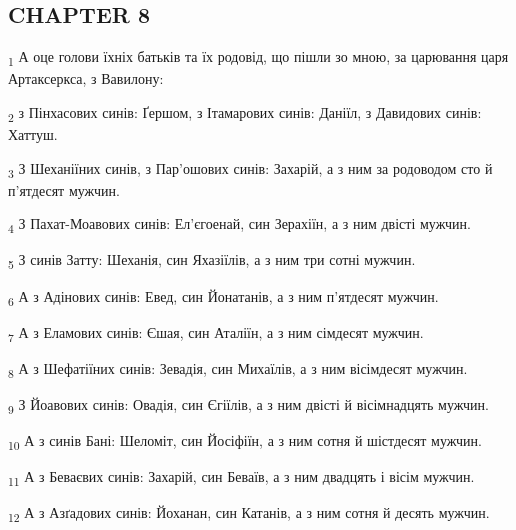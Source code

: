 \subsection{CHAPTER 8}
\begin{tcolorbox}
\textsubscript{1} А оце голови їхніх батьків та їх родовід, що пішли зо мною, за царювання царя Артаксеркса, з Вавилону:
\end{tcolorbox}
\begin{tcolorbox}
\textsubscript{2} з Пінхасових синів: Ґершом, з Ітамарових синів: Даніїл, з Давидових синів: Хаттуш.
\end{tcolorbox}
\begin{tcolorbox}
\textsubscript{3} З Шеханіїних синів, з Пар'ошових синів: Захарій, а з ним за родоводом сто й п'ятдесят мужчин.
\end{tcolorbox}
\begin{tcolorbox}
\textsubscript{4} З Пахат-Моавових синів: Ел'єгоенай, син Зерахіїн, а з ним двісті мужчин.
\end{tcolorbox}
\begin{tcolorbox}
\textsubscript{5} З синів Затту: Шеханія, син Яхазіїлів, а з ним три сотні мужчин.
\end{tcolorbox}
\begin{tcolorbox}
\textsubscript{6} А з Адінових синів: Евед, син Йонатанів, а з ним п'ятдесят мужчин.
\end{tcolorbox}
\begin{tcolorbox}
\textsubscript{7} А з Еламових синів: Єшая, син Аталіїн, а з ним сімдесят мужчин.
\end{tcolorbox}
\begin{tcolorbox}
\textsubscript{8} А з Шефатіїних синів: Зевадія, син Михаїлів, а з ним вісімдесят мужчин.
\end{tcolorbox}
\begin{tcolorbox}
\textsubscript{9} З Йоавових синів: Овадія, син Єгіїлів, а з ним двісті й вісімнадцять мужчин.
\end{tcolorbox}
\begin{tcolorbox}
\textsubscript{10} А з синів Бані: Шеломіт, син Йосіфіїн, а з ним сотня й шістдесят мужчин.
\end{tcolorbox}
\begin{tcolorbox}
\textsubscript{11} А з Беваєвих синів: Захарій, син Беваїв, а з ним двадцять і вісім мужчин.
\end{tcolorbox}
\begin{tcolorbox}
\textsubscript{12} А з Азґадових синів: Йоханан, син Катанів, а з ним сотня й десять мужчин.
\end{tcolorbox}
